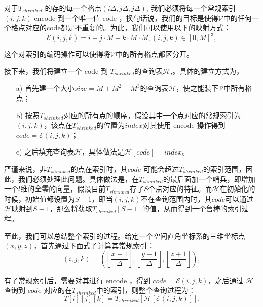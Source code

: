 对于$ T_{shrinked}$ 的存的每一个格点$\left(i\Delta, j\Delta, j\Delta\right)$, 我们必须将每一个常规索引$\left(i, j, k\right)$ encode 到一个唯一值 code ，换句话说，我们的目标是使得$\mathcal{V}$中的任何一个格点对应的code都是不重复的。为此，我们可以使用以下的映射方式：
\begin{equation}
    \mathcal{E}\left(i, j, k\right) = i + j\cdot M + k\cdot M \cdot M, \left(i, j, k\right) \in \left[0, M\right]^3,
\end{equation}

这个对索引的编码操作可以使得将$\mathcal{V}$中的所有格点都区分开。

接下来，我们将建立一个 code 到 $T_{shrinked}$的查询表$\mathcal{H}$,。具体的建立方式为，
\begin{enumerate}
    \item[a)] 首先建一个大小$size = M + M^2 + M^3$的查询表$\mathcal{H}$，使之能装下$\mathcal{V}$中所有格点；
    \item[b)] 按照$T_{shrinked}$对应的所有点的顺序，假设其中一个点对应的常规索引为$\left(i, j, k\right)$，该点在$T_{shrinked}$的位置为$index$对其使用 encode 操作得到$code = \mathcal{E}\left(i, j, k\right)$；
    \item[c)] 之后填充查询表$\mathcal{H}$，具体做法是$\mathcal{H}[code] = index$。
\end{enumerate}
严谨来说，非$T_{shrinked}$的点在索引时，其$code$ 可能会超过$T_{shrinked}$的索引范围，因此，我们必须处理此问题。具体做法是，在$T_{shrinked}$的最后面加一个哨兵，即增加一个$l$维的全零的向量，假设目前$T_{shrinked}$存了$S$个点对应的特征。而$\mathcal{H}$在初始化的时候，初始值都设置为$S-1$，即当$\left(i, j, k\right)$不在查询范围内时，其$code$可以通过$\mathcal{H}$映射到$S-1$，那么将获取$T_{shrinked}\left[S-1\right]$的值，从而得到一个鲁棒的索引过程。

至此，我们可以总结整个索引的过程。给定一个空间直角坐标系的三维坐标点$\left(x, y, z\right)$，首先通过下面式子计算其常规索引：
\begin{equation}
    \left(i, j, k\right) = \left(\left \lfloor \frac{x + 1}{\Delta} \right \rfloor, \left \lfloor \frac{y + 1}{\Delta} \right \rfloor, \left \lfloor \frac{z + 1}{\Delta} \right \rfloor\right),
\end{equation}

有了常规索引后，需要对其进行 encode ，得到 $code = \mathcal{E}\left(i, j, k\right)$，之后通过 $\mathcal{H}$ 查询到 $code$ 对应的在$T_{shrinked}$中的索引，则整个查询过程为：
\begin{equation}
    T\left[i \right]\left[j \right]\left[k \right] = T_{shrinked} \left[\mathcal{H}\left[\mathcal{E}\left(i, j, k\right) \right] \right].
\end{equation}

